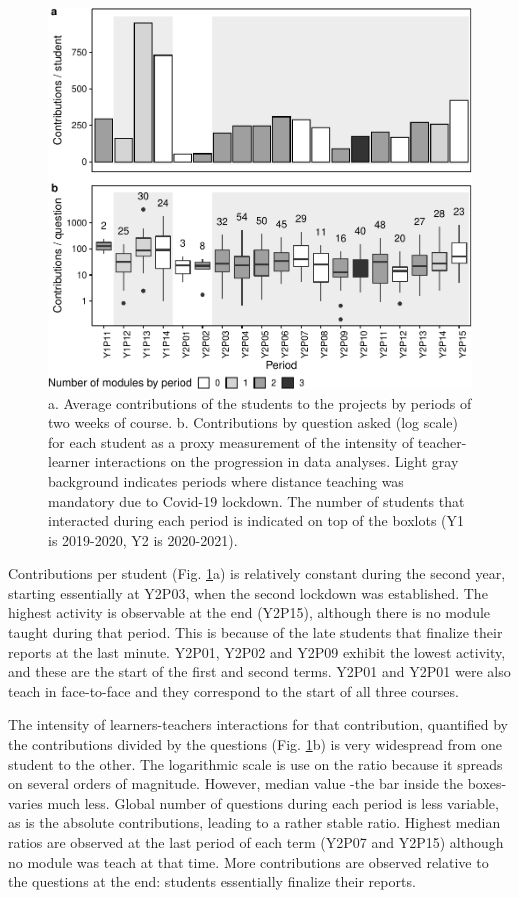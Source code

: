 \documentclass{aims}
\theoremstyle{definition}
\begin{document}
\begin{figure}
\includegraphics[width=1\linewidth]{teaching_data_science_files/figure-latex/fig_support_by_time-1} \caption{\label{fig:fig_support_by_time} a. Average contributions of the students to the projects by periods of two weeks of course. b. Contributions by question asked (log scale) for each student as a proxy measurement of the intensity of teacher-learner interactions on the progression in data analyses. Light gray background indicates periods where distance teaching was mandatory due to Covid-19 lockdown. The number of students that interacted during each period is indicated on top of the boxlots (Y1 is 2019-2020, Y2 is 2020-2021).}\label{fig:fig_support_by_time}
\end{figure}

Contributions per student (Fig. \ref {fig:fig_support_by_time}a) is
relatively constant during the second year, starting essentially at
Y2P03, when the second lockdown was established. The highest activity is
observable at the end (Y2P15), although there is no module taught during
that period. This is because of the late students that finalize their
reports at the last minute. Y2P01, Y2P02 and Y2P09 exhibit the lowest
activity, and these are the start of the first and second terms. Y2P01
and Y2P01 were also teach in face-to-face and they correspond to the
start of all three courses.

The intensity of learners-teachers interactions for that contribution,
quantified by the contributions divided by the questions (Fig.
\ref {fig:fig_support_by_time}b) is very widespread from one student to
the other. The logarithmic scale is use on the ratio because it spreads
on several orders of magnitude. However, median value -the bar inside
the boxes- varies much less. Global number of questions during each
period is less variable, as is the absolute contributions, leading to a
rather stable ratio. Highest median ratios are observed at the last
period of each term (Y2P07 and Y2P15) although no module was teach at
that time. More contributions are observed relative to the questions at
the end: students essentially finalize their reports.
\end{document}
